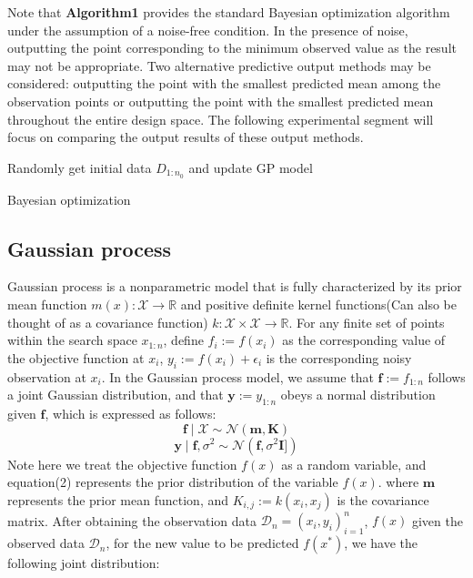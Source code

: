 \documentclass{article}
\begin{document}
\hspace{2em}
Note that \textbf{Algorithm1} provides the standard Bayesian optimization algorithm under the assumption of a noise-free condition. In the presence of noise, outputting the point corresponding to the minimum observed value as the result may not be appropriate. Two alternative predictive output methods may be considered: outputting the point with the smallest predicted mean among the observation points or outputting the point with the smallest predicted mean throughout the entire design space. The following experimental segment will focus on comparing the output results of these output methods.

\begin{algorithm}[htb]
    \SetAlgoLined
  
    Randomly get initial data $D_{1:n_0}$ and update GP model\;
    \caption{Bayesian optimization}
\end{algorithm}

\subsection{Gaussian process}
\hspace{2em}Gaussian process is a nonparametric model that is fully characterized by its prior mean function $m(x):\mathcal{X} \rightarrow \mathbb{R}$ and positive definite kernel functions(Can also be thought of as a covariance function) $k:\mathcal{X} \times \mathcal{X} \rightarrow \mathbb{R}$. For any finite set of points within the search space $x_{1:n}$, define $f_i:=f(x_i)$ as the corresponding value of the objective function at $x_i$, $y_i:=f(x_i)+\epsilon_i$ is the corresponding noisy observation at $x_i$. In the Gaussian process model, we assume that $\textbf{f}:=f_{1:n}$ follows a joint Gaussian distribution, and that $\textbf{y}:=y_{1:n}$ obeys a normal distribution given $\textbf{f}$, which is expressed as follows:
\begin{equation}\label{eq2}
    \textbf{f}\mid\mathcal{X} \sim \mathcal{N}(\textbf{m},\textbf{K})
    \end{equation}
    \begin{equation}\label{eq3}
    \textbf{y}\mid \textbf{f},\sigma^2 \sim \mathcal{N}(\textbf{f},\sigma^2\textbf{I}])
    \end{equation}
Note here we treat the objective function $f(x)$ as a random variable, and equation(2) represents the prior distribution of the variable $f(x)$. where $\textbf{m}$ represents the prior mean function, and $K_{i,j}:=k(x_i,x_j)$ is the covariance matrix. After obtaining the observation data $\mathcal{D}_n={(x_i,y_i)^n_{i=1}}$, $f(x)$ given the observed data $\mathcal{D}_n$, for the new value to be predicted $f(x^*)$, we have the following joint distribution:
\end{document}
